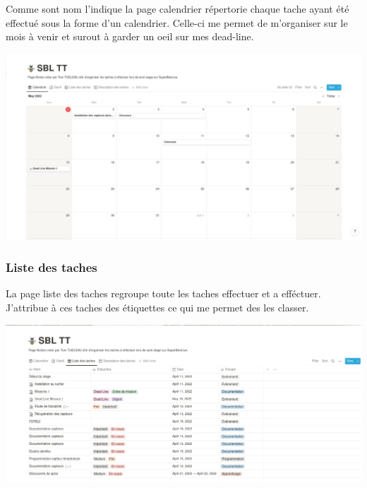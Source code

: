 \documentclass[11pt,french,a4paper]{article}
\begin{document}
Comme sont nom l'indique la page calendrier répertorie chaque tache ayant été effectué sous la forme d'un calendrier. Celle-ci me permet de m'organiser sur le mois à venir et surout à garder un oeil sur mes dead-line. 
\begin{center}	
\includegraphics[scale=0.35]{../img/notioncalender.png}
\label{Calendrier}
\end{center}

\subsubsection{Liste des taches}
La page liste des taches regroupe toute les taches effectuer et a efféctuer. J'attribue à ces taches des étiquettes ce qui me permet des les classer.   
\begin{center}	
\includegraphics[scale=0.35]{../img/notionlistesdestaches.png}
\label{Liste des taches}
\end{center}
\end{document}
